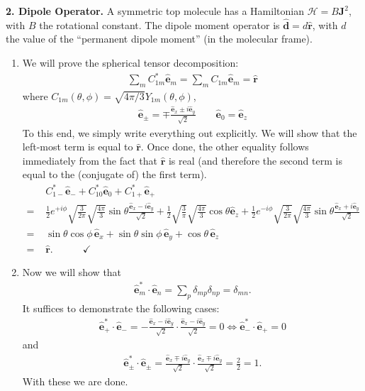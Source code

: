\documentclass{article}
\theoremstyle{definition}
\newcommand{\ham}{\mathcal{H}}
\newcommand{\f}[2]{\frac{#1}{#2}}
\begin{document}
\noindent \textbf{2. Dipole Operator.} A symmetric top molecule has a Hamiltonian $\ham = B\bm{J}^2$, with $B$ the rotational constant. The dipole moment operator is $\hat{\bm{d}} = d \hat{\bm{r}}$, with $d$ the value of the ``permanent dipole moment'' (in the molecular frame). 

\begin{enumerate}[label=(\alph*)]
	\item We will prove the spherical tensor decomposition:
	\begin{align*}
	\sum_m C_{1m}^* \hat{\bm{e}}_m = \sum_m C_{1m} \hat{\bm{e}}_m = \hat{\bm{r}}
	\end{align*}
	where $C_{1m}(\theta,\phi) = \sqrt{4\pi/3} Y_{1m}(\theta,\phi)$,
	\begin{align*}
	\hat{\bm{e}}_\pm = \mp \f{\hat{\bm{e}}_x \pm i \hat{\bm{e}}_y}{\sqrt{2}} \quad\quad \hat{\bm{e}}_0 = \hat{\bm{e}}_z
	\end{align*}
	To this end, we simply write everything out explicitly. We will show that the left-most term is equal to $\hat{\bm{r}}$. Once done, the other equality follows immediately from the fact that $\hat{\bm{r}}$ is real (and therefore the second term is equal to the (conjugate of) the first term). 
	\begin{align*}
	&C_{1-}^* \hat{\bm{e}}_{-} + 
	C_{10}^* \hat{\bm{e}}_{0}  + 
	C_{1+}^* \hat{\bm{e}}_{+}\\
	=\,\, &\f{1}{2}e^{+i\phi} \sqrt{\f{3}{2\pi}} \sqrt{\f{4\pi}{3}} \sin\theta  \f{\hat{\bm{e}}_x - i \hat{\bm{e}}_y}{\sqrt{2}} 
	+ \f{1}{2}\sqrt{\f{3}{\pi}} \sqrt{\f{4\pi}{3}} \cos\theta  \hat{\bm{e}}_z 
	+ \f{1}{2}e^{-i\phi} \sqrt{\f{3}{2\pi}} \sqrt{\f{4\pi}{3}} \sin\theta  \f{\hat{\bm{e}}_x + i \hat{\bm{e}}_y}{\sqrt{2}} \\
	=\,\, & \sin\theta\cos\phi\, {\hat{\bm{e}}}_x + \sin\theta\sin\phi\, {\hat{\bm{e}}}_y + \cos\theta \,{\hat{\bm{e}}}_z\\
	=\,\, & \hat{\bm{r}}. \quad\quad\quad \checkmark
	\end{align*}
	
	
	\item Now we will show that 
	\begin{align*}
	\hat{\bm{e}}_m^* \cdot \hat{\bm{e}}_n = \sum_p \delta_{mp}\delta_{np} = \delta_{mn}.
	\end{align*}
	It suffices to demonstrate the following cases:
	\begin{align*}
	\hat{\bm{e}}_+^*\cdot \hat{\bm{e}}_- = - \f{\hat{\bm{e}}_x - i \hat{\bm{e}}_y}{\sqrt{2}} \cdot  \f{\hat{\bm{e}}_x - i \hat{\bm{e}}_y}{\sqrt{2}} = 0  \iff \hat{\bm{e}}_-^*\cdot \hat{\bm{e}}_+ = 0
	\end{align*}
	and
	\begin{align*}
	\hat{\bm{e}}_\pm^*\cdot \hat{\bm{e}}_\pm =   \f{\hat{\bm{e}}_x \mp i \hat{\bm{e}}_y}{\sqrt{2}} \cdot  \f{\hat{\bm{e}}_x \mp i \hat{\bm{e}}_y}{\sqrt{2}} = \f{2}{2} = 1. 
	\end{align*}
	With these we are done. 
	

\end{enumerate}
\end{document}
